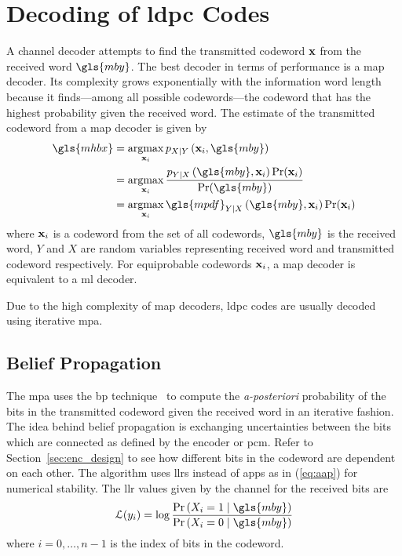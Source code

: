 \section{Decoding of \acrlong{ldpc} Codes}\label{sec:decoding_ldpc}
A channel decoder attempts to find the transmitted codeword $\mathbf{x}$ from the received word $\gls{mby}$. The best decoder in terms of performance is a \gls{map} decoder. Its complexity grows exponentially with the information word length because it finds---among all possible codewords---the codeword that has the highest probability given the received word. The estimate of the transmitted codeword from a \gls{map} decoder is given by
\begin{align}
\gls{mhbx}&=\argmax_{\x_i}\pdf_{X\mid Y}\left(\x_i,\gls{mby}\right) \nonumber\\
&=\argmax_{\x_i}\frac{\pdf_{Y\mid X}\left(\gls{mby},\x_i\right)\prob(\x_i)}{\prob(\gls{mby})} \nonumber\\
&=\argmax_{\x_i}\gls{mpdf}_{Y\mid X}\left(\gls{mby},\x_i\right)\prob(\x_i)\label{eq:aap}
\end{align}
where $\mathbf{x}_i$ is a codeword from the set of all codewords, $\gls{mby}$ is the received word, $Y$ and $X$ are random variables representing received word and transmitted codeword respectively. For equiprobable codewords $\mathbf{x}_i$, a \gls{map} decoder is equivalent to a \gls{ml} decoder.

Due to the high complexity of \gls{map} decoders, \gls{ldpc} codes are usually decoded using iterative \acrlong{mpa}.
\subsection{Belief Propagation}
The \gls{mpa} uses the \gls{bp} technique~\cite{Hagenauer1996} to compute the \emph{a-posteriori} probability of the bits in the transmitted codeword given the received word in an iterative fashion. The idea behind belief propagation is exchanging uncertainties between the bits which are connected as defined by the encoder or \gls{pcm}. Refer to Section~\ref{sec:enc_design} to see how different bits in the codeword are dependent on each other. The algorithm uses \glspl{llr} instead of \glspl{app} as in (\ref{eq:aap}) for numerical stability. The \gls{llr} values given by the channel for the received bits are
\begin{align}\mathcal{L}(y_i)=\log\frac{\prob\left(X_i=1\mid\gls{mby}\right)}{\prob\left(X_i=0\mid\gls{mby}\right)}\end{align}
where $i=0,\dots,n-1$ is the index of bits in the codeword.

